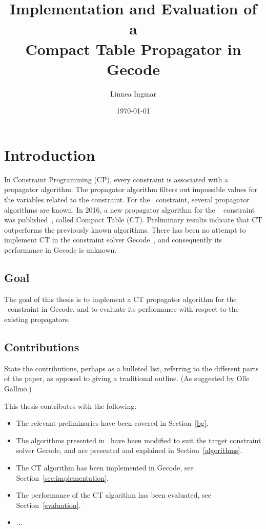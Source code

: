 \documentclass[a4paper,11pt]{article}
\title{\textbf{Implementation and Evaluation of a\\
    Compact Table Propagator in Gecode
  }
}
\author{Linnea Ingmar} %
\date{\today}
\newcommand{\Todo}[1]{{\color{blue}#1}}
\newcommand{\Chapref}[1]{Section~\ref{#1}}
\newcommand{\Table}{\Constraint{Table}~}
\newcommand{\CTpaper}[0]{DBLP:conf/cp/DemeulenaereHLP16}
\numberwithin{equation}{section}
\begin{document}
\maketitle

\tableofcontents

\newpage

\section{Introduction}
\label{intro}

In Constraint Programming (CP), every constraint is associated with a propagator
algorithm. The propagator algorithm filters out impossible values for the variables
related to the constraint. For the \Table constraint, several propagator
algorithms are known. In 2016, a new propagator algorithm for the \Table
constraint was published~\cite{\CTpaper}, called Compact Table (CT).
Preliminary results indicate that CT outperforms the previously known algorithms.
There has been no attempt to implement CT in the constraint solver Gecode~\cite{Gecode}, 
and consequently its performance in Gecode is unknown.

\subsection{Goal}
\label{intro:goal}
The goal of this thesis is to implement a CT propagator
algorithm for the \Table constraint in Gecode,
and to evaluate its performance with respect to the existing propagators.

\subsection{Contributions}
\label{intro:contributions}

\Todo{State the contributions, perhaps as a bulleted list, referring to the different
parts of the paper, as opposed to giving a traditional outline. (As suggested
by Olle Gallmo.)}

This thesis contributes with the following:

\begin{itemize}
  \item The relevant preliminaries have been covered in \Chapref{bg}.
  \item The algorithms presented in~\cite{DBLP:conf/cp/DemeulenaereHLP16} have been modified to suit the
    target constraint solver Gecode, and are presented and explained in 
    \Chapref{algorithms}.
  \item The CT algorithm has been implemented in Gecode, see \Chapref{sec:implementation}.
  \item The performance of the CT algorithm has been evaluated, see \Chapref{evaluation}.
  \item ...
\end{itemize}
\end{document}
